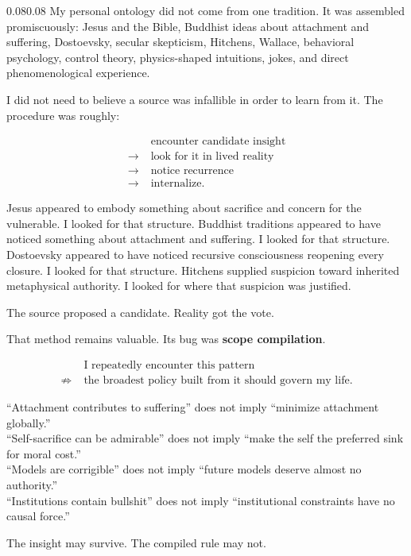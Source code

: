 \documentclass[10pt,letterpaper]{article}
\newenvironment{paperbody}
  {\begin{adjustwidth}{0.08\textwidth}{0.08\textwidth}\justifying}
  {\par\end{adjustwidth}}
\begin{document}
\begin{paperbody}
My personal ontology did not come from one tradition. It was assembled
promiscuously: Jesus and the Bible, Buddhist ideas about attachment and
suffering, Dostoevsky, secular skepticism, Hitchens, Wallace, behavioral
psychology, control theory, physics-shaped intuitions, jokes, and direct
phenomenological experience.

I did not need to believe a source was infallible in order to learn from
it. The procedure was roughly:

\[
\begin{aligned}
        &\text{encounter candidate insight}\\
  \to\;&\text{look for it in lived reality}\\
  \to\;&\text{notice recurrence}\\
  \to\;&\text{internalize}.
\end{aligned}
\]

Jesus appeared to embody something about sacrifice and concern for the
vulnerable. I looked for that structure. Buddhist traditions appeared to
have noticed something about attachment and suffering. I looked for that
structure. Dostoevsky appeared to have noticed recursive consciousness
reopening every closure. I looked for that structure. Hitchens supplied
suspicion toward inherited metaphysical authority. I looked for where
that suspicion was justified.

The source proposed a candidate. Reality got the vote.

That method remains valuable. Its bug was \textbf{scope compilation}.

\[
\begin{aligned}
             &\text{I repeatedly encounter this pattern}\\
  \not\Rightarrow\;&\text{the broadest policy built from it should govern my life}.
\end{aligned}
\]

``Attachment contributes to suffering'' does not imply ``minimize
attachment globally.''\\
``Self-sacrifice can be admirable'' does not imply ``make the self the
preferred sink for moral cost.''\\
``Models are corrigible'' does not imply ``future models deserve almost
no authority.''\\
``Institutions contain bullshit'' does not imply ``institutional
constraints have no causal force.''

The insight may survive. The compiled rule may not.


\end{paperbody}
\end{document}
